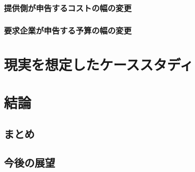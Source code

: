 \hypertarget{ux63d0ux4f9bux5074ux304cux7533ux544aux3059ux308bux30b3ux30b9ux30c8ux306eux5e45ux306eux5909ux66f4-1}{%
\subsection{提供側が申告するコストの幅の変更}\label{ux63d0ux4f9bux5074ux304cux7533ux544aux3059ux308bux30b3ux30b9ux30c8ux306eux5e45ux306eux5909ux66f4-1}}

\hypertarget{ux8981ux6c42ux4f01ux696dux304cux7533ux544aux3059ux308bux4e88ux7b97ux306eux5e45ux306eux5909ux66f4-1}{%
\subsection{要求企業が申告する予算の幅の変更}\label{ux8981ux6c42ux4f01ux696dux304cux7533ux544aux3059ux308bux4e88ux7b97ux306eux5e45ux306eux5909ux66f4-1}}

\hypertarget{ux73feux5b9fux3092ux60f3ux5b9aux3057ux305fux30b1ux30fcux30b9ux30b9ux30bfux30c7ux30a3}{%
\chapter{現実を想定したケーススタディ}\label{ux73feux5b9fux3092ux60f3ux5b9aux3057ux305fux30b1ux30fcux30b9ux30b9ux30bfux30c7ux30a3}}

\hypertarget{ux7d50ux8ad6}{%
\chapter{結論}\label{ux7d50ux8ad6}}

\hypertarget{ux307eux3068ux3081}{%
\section{まとめ}\label{ux307eux3068ux3081}}

\hypertarget{ux4ecaux5f8cux306eux5c55ux671b}{%
\section{今後の展望}\label{ux4ecaux5f8cux306eux5c55ux671b}}
